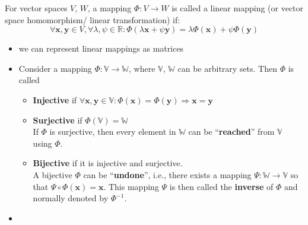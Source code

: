 For vector spaces $V$, $W$, a mapping $\Phi : V \rightarrow W$ is called a linear mapping (or vector space homomorphism/ linear transformation) if:
\[
    \forall \mathbf{x, y} \in V, \forall\lambda, \psi \in \mathbb{R} : \Phi(\lambda\mathbf{x} + \psi\mathbf{y}) = \lambda\Phi(\mathbf{x}) + \psi\Phi(\mathbf{y})
\]

\begin{itemize}
    \item we can represent linear mappings as matrices
    \item Consider a mapping $\Phi : \mathbb{V} \rightarrow \mathbb{W}$, where $\mathbb{V}$, $\mathbb{W}$ can be arbitrary sets. Then $\Phi$ is called
    \begin{itemize}
        \item \textbf{Injective} if $\forall \mathbf{x, y} \in \mathbb{V}: \Phi(\mathbf{x}) = \Phi(\mathbf{y}) \Rightarrow \mathbf{x} = \mathbf{y}$ \label{Injective mapping}

        \item \textbf{Surjective} if $\Phi(\mathbb{V}) = \mathbb{W}$\label{Surjective mapping}\\
        If $\Phi$ is surjective, then every element in $\mathbb{W}$ can be “\textbf{reached}” from $\mathbb{V}$ using $\Phi$.

        \item \textbf{Bijective} if it is injective and surjective.\label{Bijective mapping}\\
        A bijective $\Phi$ can be “\textbf{undone}”, i.e., there exists a mapping $\Psi : \mathbb{W} \rightarrow \mathbb{V}$ so that $\Psi \circ \Phi(\textbf{x}) = \textbf{x}$. This mapping $\Psi$ is then called the \textbf{inverse} of $\Phi$ and normally denoted by $\Phi^{-1}$.\label{inverse linear mapping}
        
    \end{itemize}

    \item 
    
\end{itemize}











